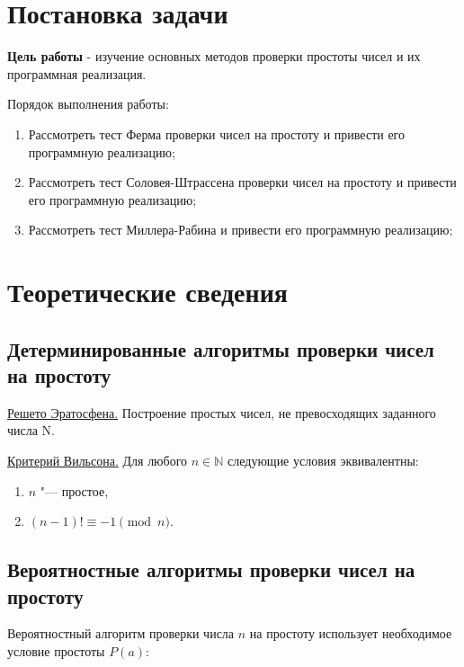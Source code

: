 \documentclass[bachelor, och, labwork]{shiza}
\begin{document}

\section{Постановка задачи}

    \textbf{Цель работы} - изучение основных методов проверки простоты чисел и
    их программная реализация. 

    Порядок выполнения работы:
    \begin{enumerate}
        \item Рассмотреть тест Ферма проверки чисел на простоту и привести его
        программную реализацию;
        \item Рассмотреть тест Соловея-Штрассена проверки чисел на простоту и
        привести его программную реализацию;
        \item Рассмотреть тест Миллера-Рабина и привести его программную
        реализацию;
    \end{enumerate}

\section{Теоретические сведения}

    \subsection{Детерминированные алгоритмы проверки чисел на простоту}

        \underline{Решето Эратосфена.} Построение простых чисел, не
        превосходящих заданного числа N.

        \underline{Критерий Вильсона.} Для любого $n \in \mathbb{N}$ следующие
        условия эквивалентны:

        \begin{enumerate}
            \item $n$ "--- простое,
            \item $(n - 1)! \equiv -1 \pmod n$.
        \end{enumerate}

    \subsection{Вероятностные алгоритмы проверки чисел на простоту}

        Вероятностный алгоритм проверки числа $n$ на простоту использует
        необходимое условие простоты $P(a)$:
\end{document}

